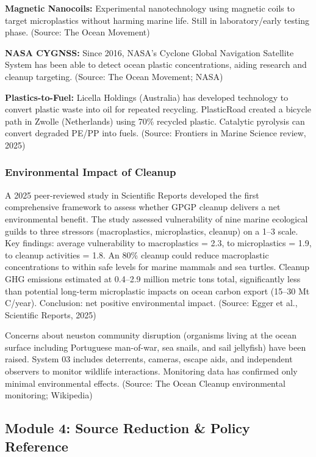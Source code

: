 \documentclass[11pt,letterpaper]{article}
\begin{document}
\textbf{Magnetic Nanocoils:} Experimental nanotechnology using magnetic coils to target microplastics without harming marine life. Still in laboratory/early testing phase. (Source: The Ocean Movement)

\textbf{NASA CYGNSS:} Since 2016, NASA's Cyclone Global Navigation Satellite System has been able to detect ocean plastic concentrations, aiding research and cleanup targeting. (Source: The Ocean Movement; NASA)

\textbf{Plastics-to-Fuel:} Licella Holdings (Australia) has developed technology to convert plastic waste into oil for repeated recycling. PlasticRoad created a bicycle path in Zwolle (Netherlands) using 70\% recycled plastic. Catalytic pyrolysis can convert degraded PE/PP into fuels. (Source: Frontiers in Marine Science review, 2025)

\subsubsection{Environmental Impact of Cleanup}
A 2025 peer-reviewed study in Scientific Reports developed the first comprehensive framework to assess whether GPGP cleanup delivers a net environmental benefit. The study assessed vulnerability of nine marine ecological guilds to three stressors (macroplastics, microplastics, cleanup) on a 1--3 scale. Key findings: average vulnerability to macroplastics = 2.3, to microplastics = 1.9, to cleanup activities = 1.8. An 80\% cleanup could reduce macroplastic concentrations to within safe levels for marine mammals and sea turtles. Cleanup GHG emissions estimated at 0.4--2.9 million metric tons total, significantly less than potential long-term microplastic impacts on ocean carbon export (15--30 Mt C/year). Conclusion: net positive environmental impact. (Source: Egger et al., Scientific Reports, 2025)

Concerns about neuston community disruption (organisms living at the ocean surface including Portuguese man-of-war, sea snails, and sail jellyfish) have been raised. System 03 includes deterrents, cameras, escape aids, and independent observers to monitor wildlife interactions. Monitoring data has confirmed only minimal environmental effects. (Source: The Ocean Cleanup environmental monitoring; Wikipedia)

\subsection{Module 4: Source Reduction \& Policy Reference}
\end{document}
